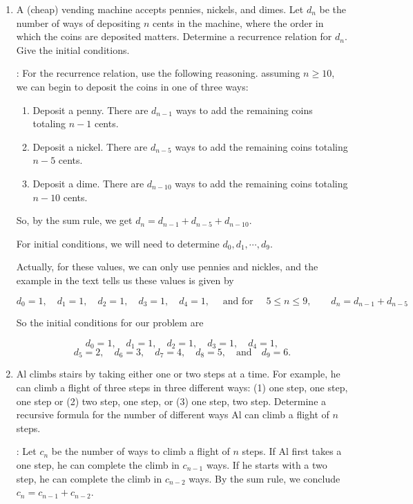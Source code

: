 \documentclass[11pt]{amsart}
\begin{document}
\begin{enumerate}

\item A (cheap) vending machine accepts pennies, nickels, and dimes. Let
$d_n$ be the number of ways of depositing $n$ cents in the machine, where the
order in which the coins are deposited matters. Determine a recurrence relation
for $d_n$. Give the initial conditions.

: For the recurrence relation, use the following reasoning.
assuming $n\geq10$, we can begin to deposit the coins in one of three ways:
\begin{enumerate}
\item Deposit a penny. There are $d_{n-1}$ ways to add the remaining coins totaling $n-1$ cents.

\item Deposit a nickel. There are $d_{n-5}$ ways to add the remaining coins totaling $n-5$ cents.

\item Deposit a dime. There are $d_{n-10}$ ways to add the remaining coins totaling $n-10$ cents.
\end{enumerate}

So, by the sum rule, we get $d_n = d_{n-1}+d_{n-5}+d_{n-10}$.

For initial conditions, we will need to determine $d_0,d_1,\cdots,d_9$.

Actually, for these values, we can only use pennies and nickles, and the example
in the text tells us these values is given by

\[
d_0 =1,\quad d_1=1,\quad d_2=1,\quad d_3=1,\quad d_4=1,
\quad\text{ and for }\quad 5\leq n\leq 9, \qquad d_n = d_{n-1}+d_{n-5}
\]

So the initial conditions for our problem are

\[
d_0 =1,\quad d_1=1,\quad d_2=1,\quad d_3=1,\quad
d_4 = 1,\]
\vskip -10pt
\[ d_5=2,\quad d_6 =3,\quad d_7=4,\quad 
d_8 = 5,\quad \text{and}\quad d_9 =6.
\]

\medskip

\item Al climbs stairs by taking either one or two steps at a time. For example,
he can climb a flight of three  steps in three different ways:
(1) one step, one step, one step or (2) two step, one step, or (3) one step, two step.
Determine a recursive formula for the number of different ways Al can climb a
flight of $n$ steps.

: Let $c_n$ be the number of ways to climb a flight of $n$ steps.
If Al first takes a one step, he can complete the climb in $c_{n-1}$ ways. If he
starts with a two step, he can complete the climb in $c_{n-2}$ ways. By the sum
rule, we conclude $c_n= c_{n-1}+c_{n-2}$.


\end{enumerate}
\end{document}
